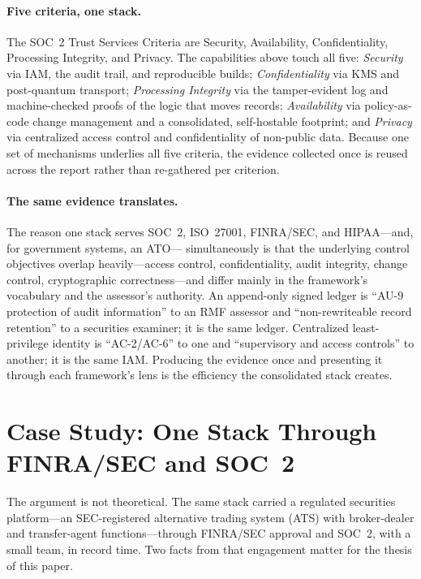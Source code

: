 \documentclass[11pt,letterpaper]{article}
\begin{document}
\paragraph{Five criteria, one stack.} The SOC~2 Trust Services Criteria are Security,
Availability, Confidentiality, Processing Integrity, and Privacy. The capabilities
above touch all five: \emph{Security} via IAM, the audit trail, and reproducible
builds; \emph{Confidentiality} via KMS and post-quantum transport; \emph{Processing
Integrity} via the tamper-evident log and machine-checked proofs of the logic that
moves records; \emph{Availability} via policy-as-code change management and a
consolidated, self-hostable footprint; and \emph{Privacy} via centralized
access control and confidentiality of non-public data. Because one set of mechanisms
underlies all five criteria, the evidence collected once is reused across the report
rather than re-gathered per criterion.

\paragraph{The same evidence translates.} The reason one stack serves SOC~2,
ISO~27001, FINRA/SEC, and HIPAA---and, for government systems, an ATO---
simultaneously is that the underlying control objectives
overlap heavily---access control, confidentiality, audit integrity, change control,
cryptographic correctness---and differ mainly in the framework's vocabulary and the
assessor's authority. An append-only signed ledger is ``AU-9 protection of audit
information'' to an RMF assessor and ``non-rewriteable record retention'' to a
securities examiner; it is the same ledger. Centralized least-privilege identity is
``AC-2/AC-6'' to one and ``supervisory and access controls'' to another; it is the
same IAM. Producing the evidence once and presenting it through each framework's lens
is the efficiency the consolidated stack creates.

\section{Case Study: One Stack Through FINRA/SEC and SOC~2}

The argument is not theoretical. The same stack carried a regulated securities
platform---an SEC-registered alternative trading system (ATS) with broker-dealer and
transfer-agent functions---through FINRA/SEC approval and SOC~2, with a small team, in
record time. Two facts from that engagement matter for the thesis of this paper.
\end{document}
